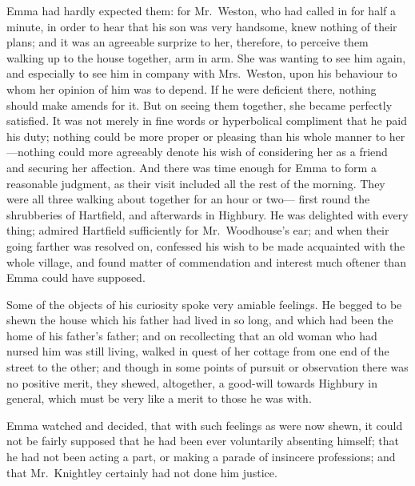 Emma had hardly expected them:  for Mr.\ Weston, who had called in
for half a minute, in order to hear that his son was very handsome,
knew nothing of their plans; and it was an agreeable surprize
to her, therefore, to perceive them walking up to the house together,
arm in arm.  She was wanting to see him again, and especially
to see him in company with Mrs.\ Weston, upon his behaviour to whom
her opinion of him was to depend.  If he were deficient there,
nothing should make amends for it.  But on seeing them together,
she became perfectly satisfied.  It was not merely in fine words
or hyperbolical compliment that he paid his duty; nothing could be
more proper or pleasing than his whole manner to her---nothing could
more agreeably denote his wish of considering her as a friend and
securing her affection.  And there was time enough for Emma to form a
reasonable judgment, as their visit included all the rest of the morning.
They were all three walking about together for an hour or two---%
first round the shrubberies of Hartfield, and afterwards in Highbury.
He was delighted with every thing; admired Hartfield sufficiently
for Mr.\ Woodhouse's ear; and when their going farther was resolved on,
confessed his wish to be made acquainted with the whole village,
and found matter of commendation and interest much oftener than Emma
could have supposed.

Some of the objects of his curiosity spoke very amiable feelings.
He begged to be shewn the house which his father had lived in so long,
and which had been the home of his father's father; and on recollecting
that an old woman who had nursed him was still living, walked in quest
of her cottage from one end of the street to the other; and though
in some points of pursuit or observation there was no positive merit,
they shewed, altogether, a good-will towards Highbury in general,
which must be very like a merit to those he was with.

Emma watched and decided, that with such feelings as were now shewn,
it could not be fairly supposed that he had been ever voluntarily
absenting himself; that he had not been acting a part, or making
a parade of insincere professions; and that Mr.\ Knightley certainly
had not done him justice.

